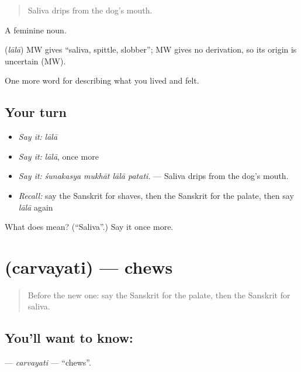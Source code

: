 \begin{quote}
Saliva drips from the dog's mouth.
\end{quote}

A feminine noun.

\begin{cousinweb}
\textbf{} (\emph{lālā}) MW gives \textquotedblleft{}saliva, spittle, slobber\textquotedblright{}; MW gives no derivation, so its origin is uncertain (MW).
\end{cousinweb}

\begin{grammarlens}[title={What you've built}]
One more word for describing what you lived and felt.
\end{grammarlens}

\subsection*{Your turn}
\begin{itemize}
\raggedright
  \item \emph{Say it:} \emph{lālā}
  \item \emph{Say it:} \emph{lālā}, once more
  \item \emph{Say it:} \emph{śunakasya mukhāt lālā patati.} — Saliva drips from the dog's mouth.
  \item \emph{Recall:} say the Sanskrit for shaves, then the Sanskrit for the palate, then say \emph{lālā} again
\end{itemize}

\begin{tcolorbox}[breakable,colback=teal!4,colframe=teal!35!black,title={Before you move on}]
What does  mean? (\textquotedblleft{}Saliva\textquotedblright{}.) Say it once more.
\end{tcolorbox}
\section[\texorpdfstring{\sk{चर्वयति} (carvayati)}{चर्वयति (carvayati)}]{ (carvayati) — chews}

\label{lesson:SA-C472-carvayati}



\begin{quote}
Before the new one: say the Sanskrit for the palate, then the Sanskrit for saliva.
\end{quote}

\subsection*{You'll want to know: }
\textbf{} — \emph{carvayati} — \textquotedblleft{}chews\textquotedblright{}.

